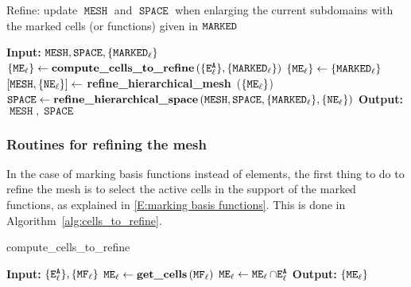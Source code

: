 \documentclass[a4paper]{siamltex1213}
\newcommand{\activeelements}[1]{\tt E^A_{#1}}
\DeclareMathOperator\mesh{\texttt{MESH}}
\DeclareMathOperator\basis{\texttt{SPACE}}
\DeclareMathOperator\marked{\tt MARKED}
\DeclareMathOperator\newcells{\tt NE}
\DeclareMathOperator\markedelements{\tt ME}
\DeclareMathOperator\functionstoremove{\tt MF}
\begin{document}
\begin{algorithm}
\caption{Refine: update $\mesh$ and $\basis$ when enlarging the current subdomains with the marked cells (or functions) given in $\marked$} \label{alg:refine}
\begin{algorithmic}[1]
\Statex \textbf{Input:} $\mesh, \basis, \{\marked_\ell\}$
\State $\{\markedelements_\ell\} \gets \textbf{compute\_cells\_to\_refine} \, (\{\activeelements{\ell}\}, \{\marked_\ell\})$
\State $\{\markedelements_\ell\} \gets \{\marked_\ell\}$
\EndIf
\State $[\mesh, \{\newcells_\ell\}] \gets$ \textbf{refine\_hierarchical\_mesh}\, ($\{\markedelements_\ell\}$)
\State $\basis \gets \textbf{refine\_hierarchical\_space} \, (\mesh, \basis, \{\marked_\ell\}, \{\newcells_\ell\})$
\Statex \textbf{Output:} $\mesh, \basis$
\end{algorithmic}
\end{algorithm}


\subsubsection{Routines for refining the mesh} \mbox{}
In the case of marking basis functions instead of elements, the first thing to do to refine the mesh is to select the active cells in the support of the marked functions, as explained in \eqref{E:marking basis functions}. This is done in Algorithm~\ref{alg:cells_to_refine}.
\begin{algorithm}
\caption{compute\_cells\_to\_refine} \label{alg:cells_to_refine}
\begin{algorithmic}[1]
\Statex \textbf{Input:} $\{\activeelements{\ell}\}, \{\functionstoremove_\ell\}$
 \State $\markedelements_\ell \gets \textbf{get\_cells} \, (\functionstoremove_\ell)$
 \State $\markedelements_\ell \gets \markedelements_\ell\cap \activeelements{\ell}$
\EndFor
\Statex \textbf{Output:} $\{\markedelements_\ell\}$
\end{algorithmic}
\end{algorithm}
\end{document}
